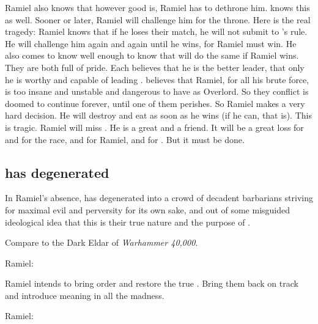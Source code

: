 Ramiel also knows that however good \Dasteron is, Ramiel has to dethrone him.
\Dasteron knows this as well.
Sooner or later, Ramiel will challenge him for the throne.
Here is the real tragedy:
Ramiel knows that if he loses their match, he will not submit to \Dasteron's rule.
He will challenge him again and again until he wins, for Ramiel must win.
He also comes to know \Dasteron well enough to know that \Dasteron will do the same if Ramiel wins.
They are both full of pride.
Each believes that he is the better leader, that only he is worthy and capable of leading \Mystraacht.
\Dasteron believes that Ramiel, for all his brute force, is too insane and unstable and dangerous to have as Overlord.
So they conflict is doomed to continue forever, until one of them perishes.
So Ramiel makes a very hard decision.
He will destroy and eat \Dasteron as soon as he wins (if he can, that is). 
This is tragic.
Ramiel will miss \Dasteron.
He is a great \resphan and a friend.
It will be a great loss for \Mystraacht and for the \resphan race, and for Ramiel, and for \Cishiel.
But it must be done.










\subsection{\Mystraacht{} has degenerated}
In Ramiel's absence, \Mystraacht{} has degenerated into a crowd of decadent barbarians striving for maximal evil and perversity for its own sake, and out of some misguided ideological idea that this is their true nature and the purpose of \Mystraacht. 

Compare to the Dark Eldar of \emph{Warhammer 40,000}.

Ramiel: 

Ramiel intends to bring order and restore the true \Mystraacht. 
Bring them back on track and introduce meaning in all the madness. 

Ramiel: 

